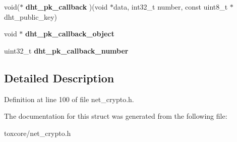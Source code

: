 \begin{DoxyCompactItemize}
\item 
\hypertarget{struct_crypto___connection_ab0f780a41ece58bf84d8460e71cbdbb3}{void($\ast$ {\bfseries dht\+\_\+pk\+\_\+callback} )(void $\ast$data, int32\+\_\+t number, const uint8\+\_\+t $\ast$dht\+\_\+public\+\_\+key)}\label{struct_crypto___connection_ab0f780a41ece58bf84d8460e71cbdbb3}

\item 
\hypertarget{struct_crypto___connection_ab5d618d73b8d83fb07209433e7b448ee}{void $\ast$ {\bfseries dht\+\_\+pk\+\_\+callback\+\_\+object}}\label{struct_crypto___connection_ab5d618d73b8d83fb07209433e7b448ee}

\item 
\hypertarget{struct_crypto___connection_ab0413da421baacf312141b8ae3ec7762}{uint32\+\_\+t {\bfseries dht\+\_\+pk\+\_\+callback\+\_\+number}}\label{struct_crypto___connection_ab0413da421baacf312141b8ae3ec7762}

\end{DoxyCompactItemize}


\subsection{Detailed Description}


Definition at line 100 of file net\+\_\+crypto.\+h.



The documentation for this struct was generated from the following file\+:\begin{DoxyCompactItemize}
\item 
toxcore/net\+\_\+crypto.\+h\end{DoxyCompactItemize}
